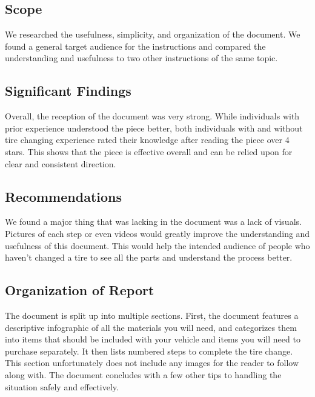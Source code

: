 \documentclass[12pt,A4paper]{article}
\begin{document}
		\subsection{Scope}
		We researched the usefulness, simplicity, and organization of the document. We found a general target audience for the instructions and compared the understanding and usefulness to two other instructions of the same topic.

		\subsection{Significant Findings}
		Overall, the reception of the document was very strong. While individuals with prior experience understood the piece better, both individuals with and without tire changing experience rated their knowledge after reading the piece over 4 stars. This shows that the piece is effective overall and can be relied upon for clear and consistent direction.

		\subsection{Recommendations}
		We found a major thing that was lacking in the document was a lack of visuals. Pictures of each step or even videos would greatly improve the understanding and usefulness of this document. This would help the intended audience of people who haven't changed a tire to see all the parts and understand the process better.

		\subsection{Organization of Report}
		The document is split up into multiple sections. First, the document features a descriptive infographic of all the materials you will need, and categorizes them into items that should be included with your vehicle and items you will need to purchase separately. It then lists numbered steps to complete the tire change. This section unfortunately does not include any images for the reader to follow along with. The document concludes with a few other tips to handling the situation safely and effectively.
\end{document}

